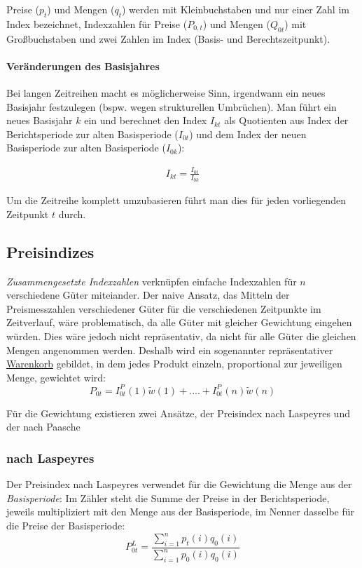 \documentclass[a4paper]{article}
\newcommand\dangersign[1][2ex]{%
  \renewcommand\stacktype{L}%
  \scaleto{\stackon[1.3pt]{\color{red}$\triangle$}{\tiny !}}{#1}%
}
\begin{document}
\noindent \dangersign[3ex] Preise ($p_t$) und Mengen ($q_t$) werden mit Kleinbuchstaben und nur einer Zahl im Index bezeichnet, Indexzahlen für Preise ($P_{0,t}$) und Mengen ($Q_{0t}$) mit Großbuchstaben und zwei Zahlen im Index (Basis- und Berechtszeitpunkt).

\paragraph{Veränderungen des Basisjahres} Bei langen Zeitreihen macht es möglicherweise Sinn, irgendwann ein neues Basisjahr festzulegen (bspw. wegen strukturellen Umbrüchen). Man führt ein neues Basisjahr $k$ ein und berechnet den Index $I_{kt}$ als Quotienten aus Index der Berichtsperiode zur alten Basisperiode ($I_{0t}$) und dem Index der neuen Basisperiode zur alten Basisperiode ($I_{0k}$):

\begin{align*}
    I_{kt}=\frac{I_{0t}}{I_{0k}}
\end{align*}

\noindent Um die Zeitreihe komplett umzubasieren führt man dies für jeden vorliegenden Zeitpunkt $t$ durch.

\clearpage

\subsection{Preisindizes}\label{sec:preis}
\textit{Zusammengesetzte Indexzahlen} verknüpfen  einfache Indexzahlen für $n$ verschiedene Güter miteiander. Der naive Ansatz, das Mitteln der Preismesszahlen verschiedener Güter für die verschiedenen Zeitpunkte im Zeitverlauf, wäre problematisch, da alle Güter mit gleicher Gewichtung eingehen würden. Dies wäre jedoch nicht repräsentativ, da nicht für alle Güter die gleichen Mengen angenommen werden. 
Deshalb wird ein sogenannter repräsentativer \href{https://www.destatis.de/DE/Themen/Wirtschaft/Preise/Verbraucherpreisindex/Methoden/Downloads/waegungsschema-2015.pdf;jsessionid=8FB8106A47EAAE26AF0095FEDD152C69.internet8721?__blob=publicationFile}{Warenkorb} gebildet, in dem jedes Produkt einzeln, proportional zur jeweiligen Menge, gewichtet wird:
$$P_{0t}=I_{0t}^P(1) \tilde w(1)+....+I_{0t}^P(n)\tilde w (n)$$

\noindent Für die Gewichtung existieren zwei Ansätze, der Preisindex nach Laspeyres und der nach Paasche

\subsubsection{nach Laspeyres}\label{sec:p-laspeyres}
Der Preisindex nach Laspeyres verwendet für die Gewichtung die Menge aus der \textit{Basisperiode}:
Im Zähler steht die Summe der Preise in der Berichtsperiode, jeweils multipliziert mit den Menge aus der Basisperiode, im Nenner dasselbe für die Preise der Basisperiode:
$$P_{0t}^L =\frac{\sum_{i=1}^n p_t(i)q_0(i)}{\sum_{i=1}^n p_0(i)q_0(i)}$$
\end{document}
